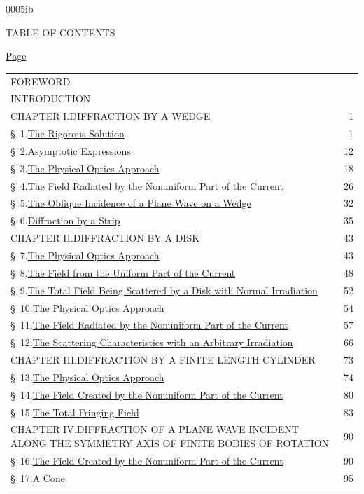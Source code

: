 \begin{scanpage}{0005}{ib}
\begin{center}TABLE OF CONTENTS\end{center}
\begin{flushright}\underline{Page}\end{flushright}
\noindent\begin{tabular}{@{}p{.89\linewidth}r@{}}
FOREWORD&\\[6pt]
INTRODUCTION&\\[8pt]
CHAPTER I.\quad DIFFRACTION BY A WEDGE&1\\
\quad\S\ 1.\quad\uline{The Rigorous Solution}&1\\
\quad\S\ 2.\quad\uline{Asymptotic Expressions}&12\\
\quad\S\ 3.\quad\uline{The Physical Optics Approach}&18\\
\quad\S\ 4.\quad\uline{The Field Radiated by the Nonuniform Part of the Current}&26\\
\quad\S\ 5.\quad\uline{The Oblique Incidence of a Plane Wave on a Wedge}&32\\
\quad\S\ 6.\quad\uline{Diffraction by a Strip}&35\\[8pt]
CHAPTER II.\quad DIFFRACTION BY A DISK&43\\
\quad\S\ 7.\quad\uline{The Physical Optics Approach}&43\\
\quad\S\ 8.\quad\uline{The Field from the Uniform Part of the Current}&48\\
\quad\S\ 9.\quad\uline{The Total Field Being Scattered by a Disk with Normal Irradiation}&52\\
\quad\S\ 10.\quad\uline{The Physical Optics Approach}&54\\
\quad\S\ 11.\quad\uline{The Field Radiated by the Nonuniform Part of the Current}&57\\
\quad\S\ 12.\quad\uline{The Scattering Characteristics with an Arbitrary Irradiation}&66\\[8pt]
CHAPTER III.\quad DIFFRACTION BY A FINITE LENGTH CYLINDER&73\\
\quad\S\ 13.\quad\uline{The Physical Optics Approach}&74\\
\quad\S\ 14.\quad\uline{The Field Created by the Nonuniform Part of the Current}&80\\
\quad\S\ 15.\quad\uline{The Total Fringing Field}&83\\[8pt]
CHAPTER IV.\quad DIFFRACTION OF A PLANE WAVE INCIDENT ALONG THE SYMMETRY AXIS OF FINITE BODIES OF ROTATION&90\\
\quad\S\ 16.\quad\uline{The Field Created by the Nonuniform Part of the Current}&90\\
\quad\S\ 17.\quad\uline{A Cone}&95
\end{tabular}
\end{scanpage}
